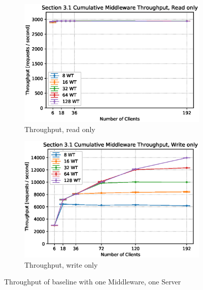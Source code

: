 \documentclass[11pt,a4paper]{article}
\begin{document}
\begin{figure}
    \begin{subfigure}{.5\textwidth}
        \includegraphics[width=1\linewidth]{plots/3_1a_throughputMiddleware.eps}
        \caption{Throughput, read only}
    \end{subfigure}
    \begin{subfigure}{.5\textwidth}
        \includegraphics[width=1\linewidth]{plots/3_1b_throughputMiddleware.eps}
        \caption{Throughput, write only}
    \end{subfigure}
    \caption{Throughput of baseline with one Middleware, one Server}
    \label{fig:3-1-throughput}
\end{figure}
\end{document}
